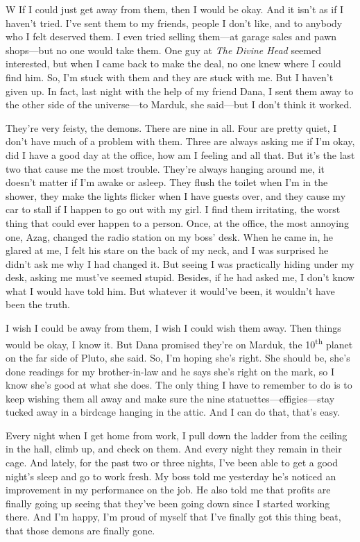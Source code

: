 W If I could just get away from them, then I would be okay. And it isn't
as if I haven't tried. I've sent them to my friends, people I don't
like, and to anybody who I felt deserved them. I even tried selling
them---at garage sales and pawn shops---but no one would take them. One
guy at \emph{The Divine Head} seemed interested, but when I came back to
make the deal, no one knew where I could find him. So, I'm stuck with
them and they are stuck with me. But I haven't given up. In fact, last
night with the help of my friend Dana, I sent them away to the other
side of the universe---to Marduk, she said---but I don't think it
worked.

They're very feisty, the demons. There are nine in all. Four are pretty
quiet, I don't have much of a problem with them. Three are always asking
me if I'm okay, did I have a good day at the office, how am I feeling
and all that. But it's the last two that cause me the most trouble.
They're always hanging around me, it doesn't matter if I'm awake or
asleep. They flush the toilet when I'm in the shower, they make the
lights flicker when I have guests over, and they cause my car to stall
if I happen to go out with my girl. I find them irritating, the worst
thing that could ever happen to a person. Once, at the office, the most
annoying one, Azag, changed the radio station on my boss' desk. When he
came in, he glared at me, I felt his stare on the back of my neck, and I
was surprised he didn't ask me why I had changed it. But seeing I was
practically hiding under my desk, asking me must've seemed stupid.
Besides, if he had asked me, I don't know what I would have told him.
But whatever it would've been, it wouldn't have been the truth.

I wish I could be away from them, I wish I could wish them away. Then
things would be okay, I know it. But Dana promised they're on Marduk,
the 10\textsuperscript{th} planet on the far side of Pluto, she said.
So, I'm hoping she's right. She should be, she's done readings for my
brother-in-law and he says she's right on the mark, so I know she's good
at what she does. The only thing I have to remember to do is to keep
wishing them all away and make sure the nine
statuettes---effigies---stay tucked away in a birdcage hanging in the
attic. And I can do that, that's easy.

Every night when I get home from work, I pull down the ladder from the
ceiling in the hall, climb up, and check on them. And every night they
remain in their cage. And lately, for the past two or three nights, I've
been able to get a good night's sleep and go to work fresh. My boss told
me yesterday he's noticed an improvement in my performance on the job.
He also told me that profits are finally going up seeing that they've
been going down since I started working there. And I'm happy, I'm proud
of myself that I've finally got this thing beat, that those demons are
finally gone.

